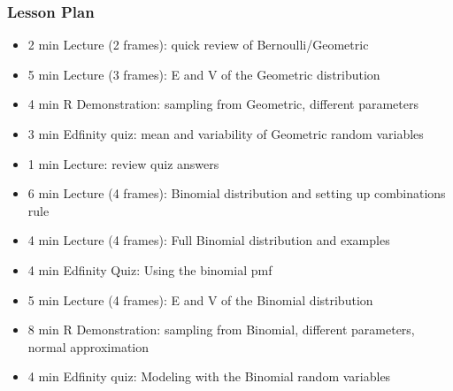 \begin{frame}
    \frametitle{Lesson Plan}
    \begin{itemize}
        \item 2 min Lecture (2 frames): quick review of Bernoulli/Geometric
        \item 5 min Lecture (3 frames): E and V of the Geometric distribution
        \item 4 min R Demonstration: sampling from Geometric, different parameters
        \item 3 min Edfinity quiz: mean and variability of Geometric random variables
        \item 1 min Lecture: review quiz answers

        \item 6 min Lecture (4 frames): Binomial distribution and setting up combinations rule
        \item 4 min Lecture (4 frames): Full Binomial distribution and examples
        \item 4 min Edfinity Quiz: Using the binomial pmf
        \item 5 min Lecture (4 frames): E and V of the Binomial distribution
        \item 8 min R Demonstration: sampling from Binomial, different parameters, normal approximation
        \item 4 min Edfinity quiz: Modeling with the Binomial random variables
    \end{itemize}
\end{frame}


